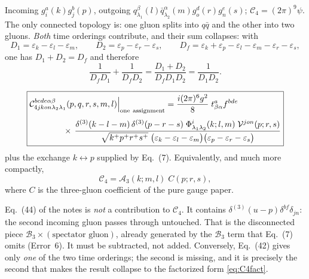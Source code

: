 \documentclass[11pt]{article}
\newcommand{\eps}{\varepsilon}
\newcommand{\dthree}{\delta^{(3)}}
\newcommand{\Ph}{\Phi}
\newcommand{\Vg}{\mathcal{V}}
\newcommand{\qk}[3]{q^{#1}_{#2}(#3)}
\newcommand{\aqk}[3]{\bar q^{#1}_{#2}(#3)}
\newcommand{\gl}[3]{g^{#1}_{#2}(#3)}
\begin{document}
Incoming $\gl{a}{i}{k}\gl{b}{j}{p}$, outgoing
$\qk{\beta}{\lambda_1}{l}\aqk{\alpha}{\lambda_2}{m}\gl{d}{o}{r}\gl{e}{n}{s}$;
$\mathcal C_{4}=(2\pi)^{9}\psi$. The only connected topology is: one gluon splits into $q\bar q$
and the other into two gluons. \emph{Both} time orderings contribute, and their sum collapses:
with
\begin{equation}
D_{1}=\eps_{k}-\eps_{l}-\eps_{m},\qquad D_{2}=\eps_{p}-\eps_{r}-\eps_{s},\qquad
D_{f}=\eps_{k}+\eps_{p}-\eps_{l}-\eps_{m}-\eps_{r}-\eps_{s},
\end{equation}
one has $D_{1}+D_{2}=D_{f}$ and therefore
\begin{equation}
\frac{1}{D_{f}D_{1}}+\frac{1}{D_{f}D_{2}}=\frac{D_{1}+D_{2}}{D_{f}D_{1}D_{2}}=\frac{1}{D_{1}D_{2}}.
\label{eq:partialfrac}
\end{equation}

\begin{res}
\begin{align}
\boxed{
\begin{aligned}
&\mathcal C^{bcde\alpha\beta}_{4jkon\lambda_2\lambda_1}(p,q,r,s,m,l)\Big|_{\rm one\ assignment}
=\frac{i(2\pi)^{6}g^{2}}{8}\;t^{a}_{\beta\alpha}f^{bde}
\\[3pt]
&\hspace{1.4cm}\times\,
\frac{\dthree(k-l-m)\,\dthree(p-r-s)\;\Ph^{i}_{\lambda_1\lambda_2}(k;l,m)\;\Vg^{jon}(p;r,s)}
{\sqrt{k^{+}p^{+}r^{+}s^{+}}\;\big(\eps_{k}-\eps_{l}-\eps_{m}\big)\big(\eps_{p}-\eps_{r}-\eps_{s}\big)}
\end{aligned}}
\label{eq:C4}
\end{align}
plus the exchange $k\!\leftrightarrow\! p$ supplied by Eq.~(7). Equivalently, and much more
compactly,
\begin{equation}
\mathcal C_{4}=\mathcal A_{3}(k;m,l)\;C(p;r,s),
\label{eq:C4fact}
\end{equation}
where $C$ is the three-gluon coefficient of the pure gauge paper.
\end{res}

\begin{note}
Eq.~(44) of the notes is \emph{not} a contribution to $\mathcal C_4$. It contains
$\dthree(u-p)\delta^{bf}\delta_{jn}$: the second incoming gluon passes through untouched. That is
the disconnected piece $\mathcal B_{3}\times(\text{spectator gluon})$, already generated by the
$\mathcal B_3$ term that Eq.~(7) omits (Error~6). It must be subtracted, not added. Conversely,
Eq.~(42) gives only \emph{one} of the two time orderings; the second is missing, and it is
precisely the second that makes the result collapse to the factorized form
\eqref{eq:C4fact}.
\end{note}
\end{document}
